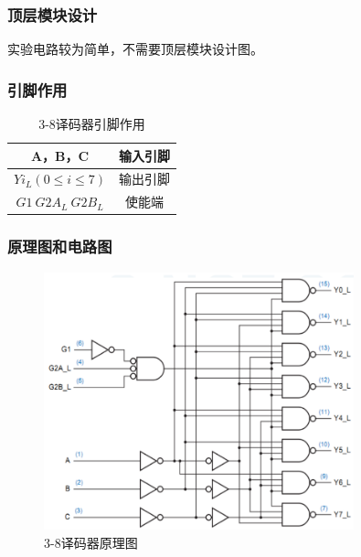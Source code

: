 \documentclass{article}
\begin{document}
    \subsubsection{顶层模块设计}
    实验电路较为简单，不需要顶层模块设计图。

    \subsubsection{引脚作用}
    \begin{table}[H]
    \centering
    \begin{tabular}{|c|c|}
        \hline
        A，B，C & 输入引脚 \\ \hline
        $Yi_L(0\le i\le 7)$   & 输出引脚 \\ \hline
        $G1\ G2A_L\ G2B_L$   & 使能端 \\ \hline
    \end{tabular}
    \caption{3-8译码器引脚作用}
    \end{table}

    \subsubsection{原理图和电路图}
    \begin{figure}[H]
    \centering
    \includegraphics[width=0.8\textwidth]{1.4.1.png}
    \caption{3-8译码器原理图}
    \end{figure}
\end{document}

